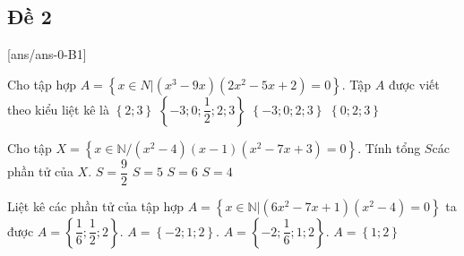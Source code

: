 \subsection{Đề 2}
[ans/ans-0-B1]
\caulc
\begin{ex}%
	Cho tập hợp $A=\left\{ x\in N|\left( {x^3}-9x \right)\left( 2x^2-5x+2 \right)=0 \right\}.$ Tập $A$ được viết theo kiểu liệt kê là
	\choice
	{$\left\{ 2;3 \right\}$}
	{$\left\{ -3;0;\dfrac{1}{2};2;3 \right\}$}
	{$\left\{ -3;0;2;3 \right\}$}
	{\True $\left\{ 0;2;3 \right\}$}
	\loigiai{		
		$\left( {x^3}-9x \right)\left( 2x^2-5x+2 \right)=0\Leftrightarrow \left[ \begin{aligned}
			& {x^3}-9x=0 \\
			& 2x^2-5x+2=0 \\
		\end{aligned} \right.\Leftrightarrow \left[ \begin{aligned}
			& x=0 \\
			& x=3 \\
			& x=2 \\
		\end{aligned} \right.$}
\end{ex}
\begin{ex}%
	Cho tập $X=\left\{ x\in \mathbb{N}/\left( {x^2}-4 \right)\left( x-1 \right)\left( {x^2}-7x+3 \right)=0 \right\}$. Tính tổng $S$các phần tử của $X$.
	\choice
	{$S=\dfrac{9}{2}$}
	{$S=5$}
	{\True $S=6$}
	{$S=4$}
\end{ex}
\begin{ex}%
	Liệt kê các phần tử của tập hợp $A=\left\{ x\in \mathbb{N}|\left( 6x^2-7x+1 \right)\left( {x^2}-4 \right)=0 \right\}$ ta được
	\choice
	{$A=\left\{ \dfrac{1}{6};\dfrac{1}{2};2 \right\}.$}
	{$A=\left\{ -2;1;2 \right\}.$}
	{$A=\left\{ -2;\dfrac{1}{6};1;2 \right\}.$}
	{\True $A=\left\{ 1;2 \right\}$}
	\loigiai{		
		Xét phương trình $\left( 6x^2-7x+1 \right)\left( {x^2}-4 \right)=0\Leftrightarrow \left[ \begin{aligned}
			& x=1\in \mathbb{N} \\
			& x=\dfrac{1}{6}\notin \mathbb{N} \\
			& x=2\in \mathbb{N} \\
			& x=-2\notin \mathbb{N} \\
		\end{aligned} \right.$.\\
		Vậy $A=\left\{ 1;2 \right\}.$}
\end{ex}
